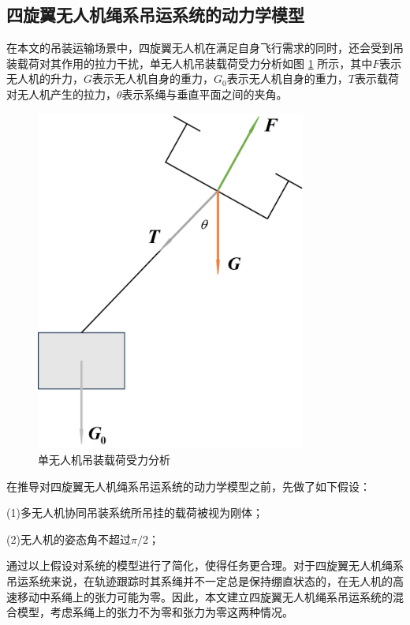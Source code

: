 \documentclass[lang=chs, degree=master, blindreview=false, winfonts=true]{yanputhesis}
\begin{document}
\subsection{四旋翼无人机绳系吊运系统的动力学模型}
在本文的吊装运输场景中，四旋翼无人机在满足自身飞行需求的同时，还会受到吊装载荷对其作用的拉力干扰，单无人机吊装载荷受力分析如图 \ref{2_2} 所示，其中$F$表示无人机的升力，$G$表示无人机自身的重力，$G_0$表示无人机自身的重力，$T$表示载荷对无人机产生的拉力，$\theta$表示系绳与垂直平面之间的夹角。
\begin{figure}[hbt!]
	\centering
	\includegraphics[width=21pc]{picture/2_2.png} 
	\caption{单无人机吊装载荷受力分析} \label{2_2}
\end{figure}

在推导对四旋翼无人机绳系吊运系统的动力学模型之前，先做了如下假设：

(1)多无人机协同吊装系统所吊挂的载荷被视为刚体； 

(2)无人机的姿态角不超过$\pi/2$；

 
通过以上假设对系统的模型进行了简化，使得任务更合理。对于四旋翼无人机绳系吊运系统来说，在轨迹跟踪时其系绳并不一定总是保持绷直状态的，在无人机的高速移动中系绳上的张力可能为零。因此，本文建立四旋翼无人机绳系吊运系统的混合模型，考虑系绳上的张力不为零和张力为零这两种情况。
\end{document}
